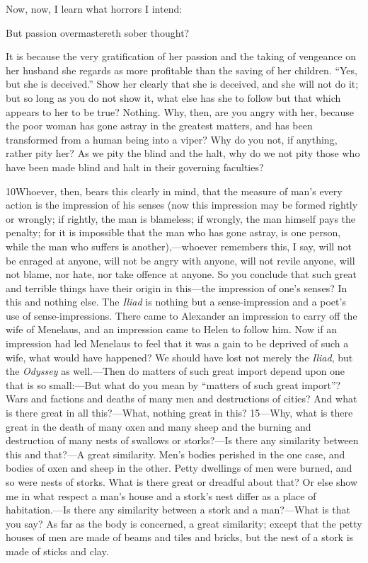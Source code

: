 Now, now, I learn what horrors I intend:

But passion overmastereth sober thought?

It is because the very gratification of her passion and the taking of vengeance on her husband she regards as more profitable than the saving of her children. ``Yes, but she is deceived.'' Show her clearly that she is deceived, and she will not do it; but so long as you do not show it, what else has she to follow but that which appears to her to be true? Nothing. Why, then, are you angry with her, because the poor woman has gone astray in the greatest matters, and has been transformed from a human being into a viper? Why do you not, if anything, rather pity her? As we pity the blind and the halt, why do we not pity those who have been made blind and halt in their governing faculties?

10Whoever, then, bears this clearly in mind, that the measure of man's every action is the impression of his senses (now this impression may be formed rightly or wrongly; if rightly, the man is blameless; if wrongly, the man himself pays the penalty; for it is impossible that the man who has gone astray, is one person, while the man who suffers is another),—whoever remembers this, I say, will not be enraged at anyone, will not be angry with anyone, will not revile anyone, will not blame, nor hate, nor take offence at anyone. So you conclude that such great and terrible things have their origin in this—the impression of one's senses? In this and nothing else. The \emph{Iliad} is nothing but a sense-impression and a poet's use of sense-impressions. There came to Alexander an impression to carry off the wife of Menelaus, and an impression came to Helen to follow him. Now if an impression had led Menelaus to feel that it was a gain to be deprived of such a wife, what would have happened? We should have lost not merely the \emph{Iliad}, but the \emph{Odyssey} as well.—Then do matters of such great import depend upon one that is so small:—But what do you mean by ``matters of such great import''? Wars and factions and deaths of many men and destructions of cities? And what is there great in all this?—What, nothing great in this? 15—Why, what is there great in the death of many oxen and many sheep and the burning and destruction of many nests of swallows or storks?—Is there any similarity between this and that?—A great similarity. Men's bodies perished in the one case, and bodies of oxen and sheep in the other. Petty dwellings of men were burned, and so were nests of storks. What is there great or dreadful about that? Or else show me in what respect a man's house and a stork's nest differ as a place of habitation.—Is there any similarity between a stork and a man?—What is that you say? As far as the body is concerned, a great similarity; except that the petty houses of men are made of beams and tiles and bricks, but the nest of a stork is made of sticks and clay.

